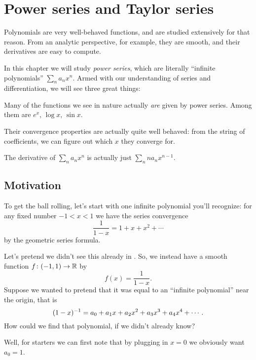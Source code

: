 \chapter{Power series and Taylor series}
\label{ch:power_series_taylor_series}
Polynomials are very well-behaved functions,
and are studied extensively for that reason.
From an analytic perspective, for example, they are smooth,
and their derivatives are easy to compute.

In this chapter we will study \emph{power series},
which are literally ``infinite polynomials'' $\sum_n a_n x^n$.
Armed with our understanding of series and differentiation,
we will see three great things:
\begin{itemize}
	\ii Many of the functions we see in nature
	actually \emph{are} given by power series.
	Among them are $e^x$, $\log x$, $\sin x$.

	\ii Their convergence properties are actually quite well behaved:
	from the string of coefficients,
	we can figure out which $x$ they converge for.

	\ii The derivative of $\sum_n a_n x^n$
	is actually just $\sum_n n a_n x^{n-1}$.
\end{itemize}

\section{Motivation}
To get the ball rolling, let's start with
one infinite polynomial you'll recognize:
for any fixed number $-1 < x < 1$ we have the series convergence
\[ \frac{1}{1-x} = 1 + x + x^2 + \cdots \]
by the geometric series formula.

Let's pretend we didn't see this already in
.
So, we instead have a smooth function $f \colon (-1,1) \to \mathbb R$ by
\[ f(x) = \frac{1}{1-x}. \]
Suppose we wanted to pretend that it was equal to
an ``infinite polynomial'' near the origin, that is
\[ (1-x)^{-1} = a_0 + a_1 x + a_2 x^2 + a_3 x^3 + a_4 x^4 + \cdots. \]
How could we find that polynomial,
if we didn't already know?

Well, for starters we can first note that by plugging in $x = 0$
we obviously want $a_0 =1$.


